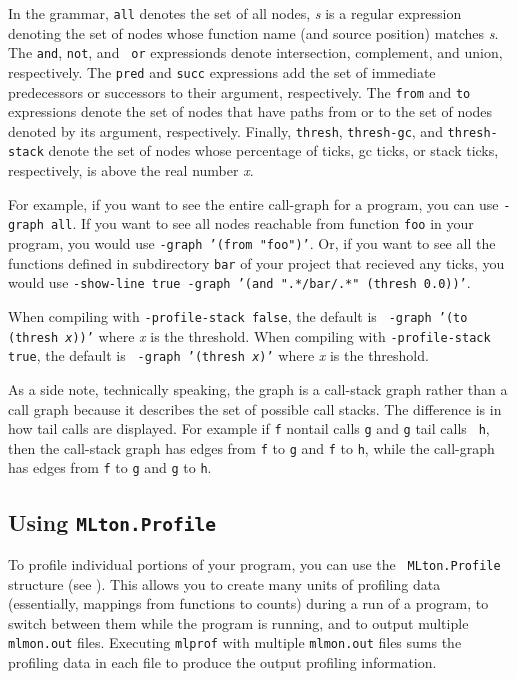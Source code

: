 In the grammar, {\tt all} denotes the set of all nodes, {\it s} is a
regular expression denoting the set of nodes whose function name (and
source position) matches {\it s}.  The {\tt and}, {\tt not}, and {\tt
or} expressionds denote intersection, complement, and union,
respectively.  The {\tt pred} and {\tt succ} expressions add the set
of immediate predecessors or successors to their argument,
respectively.  The {\tt from} and {\tt to} expressions denote the set
of nodes that have paths from or to the set of nodes denoted by its
argument, respectively.  Finally, {\tt thresh}, {\tt thresh-gc}, and
{\tt thresh-stack} denote the set of nodes whose percentage of ticks,
gc ticks, or stack ticks, respectively, is above the real number {\it
x}.

For example, if you want to see the entire call-graph for a program,
you can use {\tt -graph all}.  If you want to see all nodes reachable
from function {\tt foo} in your program, you would use {\tt -graph
'(from "foo")'}.  Or, if you want to see all the functions defined in
subdirectory {\tt bar} of your project that recieved any ticks, you
would use {\tt -show-line true -graph '(and ".*/bar/.*" (thresh
0.0))'}.

When compiling with {\tt -profile-stack false}, the default is {\tt
-graph '(to (thresh {\it x}))'} where {\it x} is the threshold.
When compiling with {\tt -profile-stack true}, the default is {\tt
-graph '(thresh {\it x})'} where {\it x} is the threshold.

As a side note, technically speaking, the graph is a call-stack graph
rather than a call graph because it describes the set of possible call
stacks.  The difference is in how tail calls are displayed.  For
example if {\tt f} nontail calls {\tt g} and {\tt g} tail calls {\tt
h}, then the call-stack graph has edges from {\tt f} to {\tt g} and
{\tt f} to {\tt h}, while the call-graph has edges from {\tt f} to
{\tt g} and {\tt g} to {\tt h}.

\subsection{Using {\tt MLton.Profile}}

To profile individual portions of your program, you can use the {\tt
MLton.Profile} structure (see ).  This
allows you to create many units of profiling data (essentially,
mappings from functions to counts) during a run of a program, to
switch between them while the program is running, and to output
multiple {\tt mlmon.out} files.  Executing {\tt mlprof} with multiple
{\tt mlmon.out} files sums the profiling data in each file to produce
the output profiling information.

